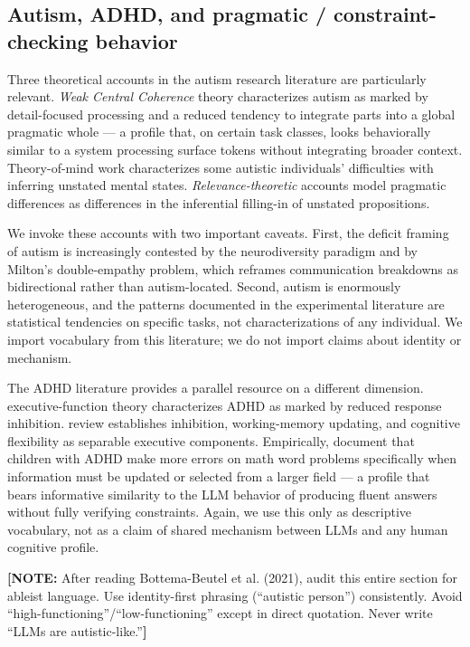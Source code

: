 \documentclass[11pt,letterpaper]{article}
\newcommand{\todonote}[1]{{\color{violet}\textbf{[NOTE:} #1\textbf{]}}}
\begin{document}
\subsection{Autism, ADHD, and pragmatic / constraint-checking behavior}

Three theoretical accounts in the autism research literature are particularly relevant. \emph{Weak Central Coherence} theory \citep{frith1989, happe2006wcc} characterizes autism as marked by detail-focused processing and a reduced tendency to integrate parts into a global pragmatic whole --- a profile that, on certain task classes, looks behaviorally similar to a system processing surface tokens without integrating broader context. Theory-of-mind work \citep{baroncohen1985, happe1994advanced} characterizes some autistic individuals' difficulties with inferring unstated mental states. \emph{Relevance-theoretic} accounts \citep{sperber1995, happe1993, loukusa2007} model pragmatic differences as differences in the inferential filling-in of unstated propositions.

We invoke these accounts with two important caveats. First, the deficit framing of autism is increasingly contested by the neurodiversity paradigm \citep{pellicano2022} and by Milton's \citeyearpar{milton2012} double-empathy problem, which reframes communication breakdowns as bidirectional rather than autism-located. Second, autism is enormously heterogeneous, and the patterns documented in the experimental literature are statistical tendencies on specific tasks, not characterizations of any individual. We import vocabulary from this literature; we do not import claims about identity or mechanism.

The ADHD literature provides a parallel resource on a different dimension. \citet{barkley1997} executive-function theory characterizes ADHD as marked by reduced response inhibition. \citet{diamond2013} review establishes inhibition, working-memory updating, and cognitive flexibility as separable executive components. Empirically, \citet{re2016} document that children with ADHD make more errors on math word problems specifically when information must be updated or selected from a larger field --- a profile that bears informative similarity to the LLM behavior of producing fluent answers without fully verifying constraints. Again, we use this only as descriptive vocabulary, not as a claim of shared mechanism between LLMs and any human cognitive profile.

\todonote{After reading Bottema-Beutel et al. (2021), audit this entire section for ableist language. Use identity-first phrasing (``autistic person'') consistently. Avoid ``high-functioning''/``low-functioning'' except in direct quotation. Never write ``LLMs are autistic-like.''}
\end{document}
